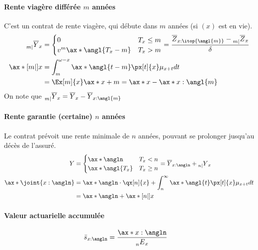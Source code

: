\documentclass[10pt, french]{article}
\begin{document}
\begin{multicols*}{3}
\paragraph{Rente viagère différée $m$ années} C'est un contrat de rente viagère, qui débute dans $m$ années (si $(x)$ est en vie).
\begin{align*}
\prescript{}{m|}{\overline{Y}}_{x} & = \begin{cases}
0						& T_x	 	\leq 	 	m	\\
v^m \ax*{\angl{T_x - m}}	& T_x 	 	>			m	\\
\end{cases} 
= \frac{\overline{Z}_{x:\itop{\angl{m}}} - \prescript{}{m|}{\overline{Z}}_{x}}{\delta} \\ 
\ax*[m|]{x}	
	& = \int_{m}^{\omega - x} \ax*{\angl{t - m}} \px[t]{x} \mu_{x+t} dt \\
	& = \Ex[m]{x} \ax*{x+m} 
	 = \ax*{x} - \ax*{x:\angl{m}} 
\end{align*}
On note que $\prescript{}{m|}{\overline{Y}}_{x} = \overline{Y}_{x} - \overline{Y}_{x:\angl{m}}$

\paragraph{Rente garantie (certaine) $n$ années} Le contrat prévoit une rente minimale de $n$ années, pouvant se prolonger jusqu'au décès de l'assuré.
\begin{align*}
Y & = \begin{cases}
\ax*{\angln}	& T_x < n \\
\ax*{\angl{T_x}}	& T_x \geq n \\
\end{cases} = \overline{Y}_{x:\angln} + \prescript{}{n|}{Y}_x \\
\ax*{\joint{x:\angln}}	
	& =\ax*{\angln} \cdot \qx[n]{x} + \int_{n}^{\infty} \ax*{\angl{t}} \px[t]{x} \mu_{x+t} dt \\
	& = \ax*{\angln} + \ax*[n|]{x} 
\end{align*}

\paragraph{Valeur actuarielle accumulée}

\begin{align*}
	\bar{s}_{x:\angln}
	&=	\frac{\ax*{x:\angln}}{\prescript{}{n}{E}_{x}}
\end{align*}


\end{multicols*}
\end{document}

